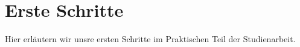 \section{Erste Schritte}\label{s:ErsteSchritte}

Hier erläutern wir unsre ersten Schritte im Praktischen Teil der Studienarbeit.